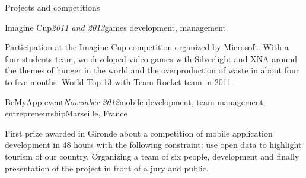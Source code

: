 \begin{rSection}{Projects and competitions}
  \begin{rSubsection}{Imagine Cup}{\em 2011 and 2013}{games development, management}{}
    \item[] Participation at the Imagine Cup competition organized by Microsoft. With a four students team, we developed video games with Silverlight and XNA around the themes of hunger in the world and the overproduction of waste in about four to five months. World Top 13 with Team Rocket team in 2011.
  \end{rSubsection}

  \begin{rSubsection}{BeMyApp event}{\em November 2012}{mobile development, team management, entrepreneurship}{Marseille, France}
    \item[] First prize awarded in Gironde about a competition of mobile application development in 48 hours with the following constraint: use open data to highlight tourism of our country. Organizing a team of six people, development and finally presentation of the project in front of a jury and public.
  \end{rSubsection}

\end{rSection}
